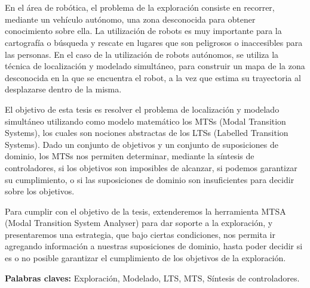 \chapter*{\runtitulo}

\noindent
En el área de robótica, el problema de la exploración consiste en recorrer, mediante un vehículo autónomo, 
una zona desconocida para obtener conocimiento sobre ella. La utilización de robots es muy importante para 
la cartografía o búsqueda y rescate en lugares que son peligrosos o inaccesibles para las personas. 
En el caso de la utilización de robots autónomos, se utiliza la técnica de localización y modelado simultáneo, 
para construir un mapa de la zona desconocida en la que se encuentra el robot, a la vez que estima su 
trayectoria al desplazarse dentro de la misma.

\vspace{\baselineskip}
El objetivo de esta tesis es resolver el problema de localización y modelado simultáneo utilizando como modelo 
matemático los MTSs (Modal Transition Systems), los cuales son nociones abstractas de los LTSs (Labelled Transition Systems). 
Dado un conjunto de objetivos y un conjunto de suposiciones de dominio, los MTSs nos permiten determinar, mediante la 
síntesis de controladores, si los objetivos son imposibles de alcanzar, si podemos garantizar su cumplimiento, o si 
las suposiciones de dominio son insuficientes para decidir sobre los objetivos.

\vspace{\baselineskip}
Para cumplir con el objetivo de la tesis, extenderemos la herramienta MTSA (Modal Transition System Analyser) para 
dar soporte a la exploración, y presentaremos una estrategia, que bajo ciertas condiciones, nos permita ir agregando 
información a nuestras suposiciones de dominio, hasta poder decidir si es o no posible garantizar el cumplimiento de 
los objetivos de la exploración.

\bigskip

\noindent\textbf{Palabras claves:} Exploración, Modelado, LTS, MTS, Síntesis de controladores.